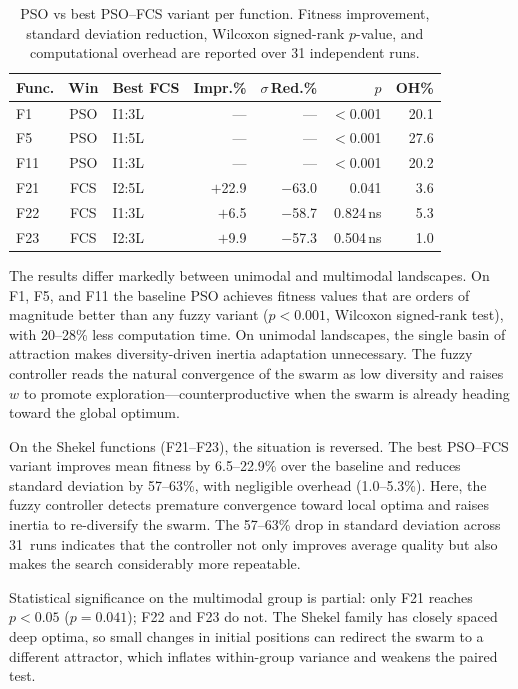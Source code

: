 \documentclass[conference]{IEEEtran}
\begin{document}
\begin{table}[ht]
    \caption{PSO vs best PSO--FCS variant per function. Fitness improvement, standard deviation reduction, Wilcoxon signed-rank $p$-value, and computational overhead are reported over 31 independent runs.}
    \label{tab:pso_vs_fcs}
    \centering
    \footnotesize
    \begin{tabular}{@{}lclrrrr@{}}
    \toprule
    Func. & Win & Best FCS & Impr.\% & $\sigma$\,Red.\% & $p$ & OH\% \\
    \midrule
    F1  & PSO & I1:3L & --- & --- & $<$0.001\rlap{***} & 20.1 \\
    F5  & PSO & I1:5L & --- & --- & $<$0.001\rlap{***} & 27.6 \\
    F11 & PSO & I1:3L & --- & --- & $<$0.001\rlap{***} & 20.2 \\
    F21 & FCS & I2:5L & $+$22.9 & $-$63.0 & 0.041\rlap{*} & 3.6 \\
    F22 & FCS & I1:3L & $+$6.5  & $-$58.7 & 0.824\,ns & 5.3 \\
    F23 & FCS & I2:3L & $+$9.9  & $-$57.3 & 0.504\,ns & 1.0 \\
    \bottomrule
    \end{tabular}
\end{table}

The results differ markedly between unimodal and multimodal landscapes. On F1, F5, and F11 the baseline PSO achieves fitness values that are orders of magnitude better than any fuzzy variant ($p < 0.001$, Wilcoxon signed-rank test), with 20--28\% less computation time. On unimodal landscapes, the single basin of attraction makes diversity-driven inertia adaptation unnecessary. The fuzzy controller reads the natural convergence of the swarm as low diversity and raises~$w$ to promote exploration---counterproductive when the swarm is already heading toward the global optimum.

On the Shekel functions (F21--F23), the situation is reversed. The best PSO--FCS variant improves mean fitness by 6.5--22.9\% over the baseline and reduces standard deviation by 57--63\%, with negligible overhead (1.0--5.3\%). Here, the fuzzy controller detects premature convergence toward local optima and raises inertia to re-diversify the swarm. The 57--63\% drop in standard deviation across 31~runs indicates that the controller not only improves average quality but also makes the search considerably more repeatable.

Statistical significance on the multimodal group is partial: only F21 reaches $p < 0.05$ ($p = 0.041$); F22 and F23 do not. The Shekel family has closely spaced deep optima, so small changes in initial positions can redirect the swarm to a different attractor, which inflates within-group variance and weakens the paired test.
\end{document}
